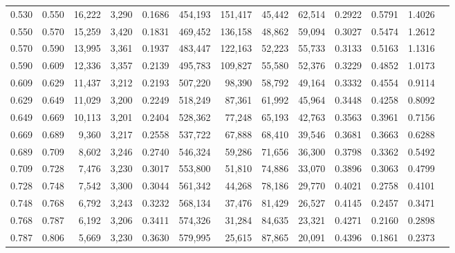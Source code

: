 \begin{tabular}{rrrrrrrrrrrrr}
0.530 & 0.550 & 16,222 & 3,290 &                                     0.1686 & 454,193 & 151,417 &  45,442 &  62,514 & 0.2922 & 0.5791 & 1.4026 \\
0.550 & 0.570 & 15,259 & 3,420 &                                     0.1831 & 469,452 & 136,158 &  48,862 &  59,094 & 0.3027 & 0.5474 & 1.2612 \\
0.570 & 0.590 & 13,995 & 3,361 &                                     0.1937 & 483,447 & 122,163 &  52,223 &  55,733 & 0.3133 & 0.5163 & 1.1316 \\
0.590 & 0.609 & 12,336 & 3,357 &                                     0.2139 & 495,783 & 109,827 &  55,580 &  52,376 & 0.3229 & 0.4852 & 1.0173 \\
0.609 & 0.629 & 11,437 & 3,212 &                                     0.2193 & 507,220 &  98,390 &  58,792 &  49,164 & 0.3332 & 0.4554 & 0.9114 \\
0.629 & 0.649 & 11,029 & 3,200 &                                     0.2249 & 518,249 &  87,361 &  61,992 &  45,964 & 0.3448 & 0.4258 & 0.8092 \\
0.649 & 0.669 & 10,113 & 3,201 &                                     0.2404 & 528,362 &  77,248 &  65,193 &  42,763 & 0.3563 & 0.3961 & 0.7156 \\
0.669 & 0.689 &  9,360 & 3,217 &                                     0.2558 & 537,722 &  67,888 &  68,410 &  39,546 & 0.3681 & 0.3663 & 0.6288 \\
0.689 & 0.709 &  8,602 & 3,246 &                                     0.2740 & 546,324 &  59,286 &  71,656 &  36,300 & 0.3798 & 0.3362 & 0.5492 \\
0.709 & 0.728 &  7,476 & 3,230 &                                     0.3017 & 553,800 &  51,810 &  74,886 &  33,070 & 0.3896 & 0.3063 & 0.4799 \\
0.728 & 0.748 &  7,542 & 3,300 &                                     0.3044 & 561,342 &  44,268 &  78,186 &  29,770 & 0.4021 & 0.2758 & 0.4101 \\
0.748 & 0.768 &  6,792 & 3,243 &                                     0.3232 & 568,134 &  37,476 &  81,429 &  26,527 & 0.4145 & 0.2457 & 0.3471 \\
0.768 & 0.787 &  6,192 & 3,206 &                                     0.3411 & 574,326 &  31,284 &  84,635 &  23,321 & 0.4271 & 0.2160 & 0.2898 \\
0.787 & 0.806 &  5,669 & 3,230 &                                     0.3630 & 579,995 &  25,615 &  87,865 &  20,091 & 0.4396 & 0.1861 & 0.2373 \\

\end{tabular}

